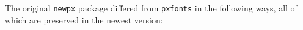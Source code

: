 \documentclass[11pt]{article}
\theoremstyle{oldplain}
\theoremstyle{plain}
\begin{document}
%


The original {\tt newpx} package differed from {\tt pxfonts} in the following ways, all of which are preserved in the newest version:
\end{document}
